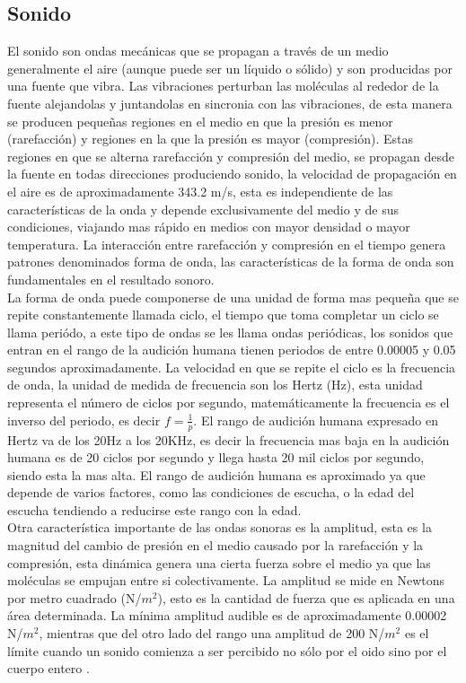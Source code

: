 \subsection{Sonido}
El sonido son ondas mec\'anicas que se propagan a trav\'es de un medio generalmente el aire (aunque puede ser un  l\'iquido o s\'olido) y son producidas por una fuente que vibra. Las vibraciones perturban las mol\'eculas al rededor de la fuente alejandolas y juntandolas en sincronia con las vibraciones, de esta manera se producen pequeñas regiones en el medio en que la presi\'on es menor (rarefacci\'on) y regiones en la que la presi\'on es mayor (compresi\'on). Estas regiones en que se alterna rarefacci\'on y compresi\'on del medio, se propagan desde la fuente en todas direcciones produciendo sonido, la velocidad de propagaci\'on en el aire es de aproximadamente 343.2 m/s, esta es independiente de las caracter\'isticas de la onda y depende exclusivamente del medio y de sus condiciones, viajando mas r\'apido en medios con mayor densidad o mayor temperatura. La interacci\'on entre rarefacci\'on y compresi\'on en el tiempo genera patrones denominados forma de onda, las caracter\'isticas de la forma de onda son fundamentales en el resultado sonoro.\\ 

La forma de onda puede componerse de una unidad de forma mas pequeña que se repite constantemente llamada ciclo, el tiempo que toma completar un ciclo se llama peri\'odo, a este tipo de ondas se les llama ondas peri\'odicas, los sonidos que entran en el rango de la audici\'on humana tienen periodos de entre 0.00005 y 0.05 segundos aproximadamente. La velocidad en que se repite el ciclo es la frecuencia de onda, la unidad de medida de frecuencia son los Hertz (Hz), esta unidad representa el n\'umero de ciclos por segundo, matem\'aticamente la frecuencia es el inverso del periodo, es decir $f = \frac{1}{p}$. El rango de audici\'on humana expresado en Hertz va de los 20Hz a los 20KHz, es decir la frecuencia mas baja en la audici\'on humana es de 20 ciclos por segundo y llega hasta 20 mil ciclos por segundo, siendo esta la mas alta. El rango de audici\'on humana es aproximado ya que depende de varios factores, como las condiciones de escucha, o la edad del escucha tendiendo a reducirse este rango con la edad.\\

Otra caracter\'istica importante de las ondas sonoras es la amplitud, esta es la magnitud del cambio de presi\'on en el medio causado por la rarefacci\'on y la compresi\'on, esta din\'amica genera una cierta fuerza sobre el medio ya que las mol\'eculas se empujan entre si colectivamente. La amplitud se mide en Newtons por metro cuadrado (N/$m^2$), esto es la cantidad de fuerza que es aplicada en una \'area determinada. La m\'inima amplitud audible es de aproximadamente 0.00002 N/$m^2$, mientras que del otro lado del rango una amplitud de 200 N/$m^2$ es el l\'imite cuando un sonido comienza a ser percibido no s\'olo por el oido sino por el cuerpo entero   \cite{dodge}.\\

